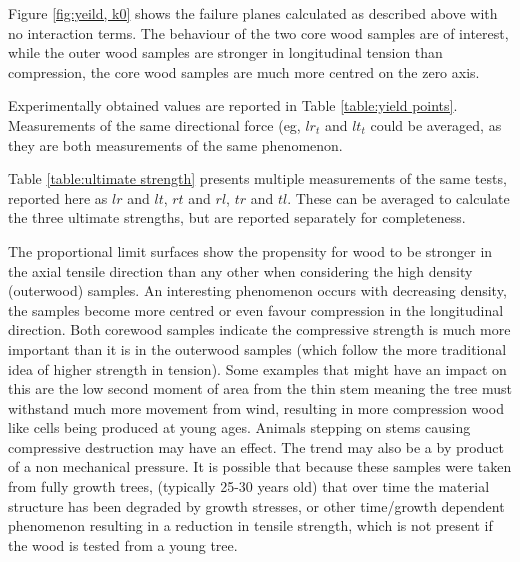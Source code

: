 \documentclass[10pt]{article}
\begin{document}
Figure \ref{fig:yeild, k0} shows the failure planes calculated as described
above with no interaction terms. The behaviour of the two core wood samples are
of interest, while the outer wood samples are stronger in longitudinal tension than compression, the core wood samples are much more centred on the zero axis.

Experimentally obtained values are reported in Table \ref{table:yield points}. Measurements of the same directional force
(eg, \(lr_t\) and \(lt_t\) could be averaged, as they are both measurements of the same  phenomenon.

Table \ref{table:ultimate strength} presents multiple measurements of the same tests,
reported here as \(lr\) and \(lt\), \(rt\) and \(rl\), \(tr\) and \(tl\). These can be averaged to calculate the three
ultimate strengths, but are reported separately for completeness.

The proportional limit surfaces show the propensity for wood to be stronger in the axial tensile direction than any other when considering
the high density (outerwood) samples. An interesting phenomenon occurs with decreasing density, the samples become more centred or even
favour compression in the longitudinal direction. Both corewood samples indicate
the compressive strength is much more important than it is in the outerwood samples
(which follow the more traditional idea of higher strength in tension).
Some examples that might have an impact on this are the low second moment of area from the thin
stem meaning the tree must withstand much more movement from wind, resulting in more compression wood like cells being produced
 at young ages. Animals stepping on stems causing compressive destruction may have an effect.
 The trend may also be a by product of a non mechanical pressure. It is possible that because these samples were taken from
 fully growth trees, (typically 25-30 years old) that over time the material structure has been degraded by growth stresses,
 or other time/growth dependent phenomenon resulting in a reduction in tensile strength, which is not present if the wood is tested
 from a young tree.

\end{document}
